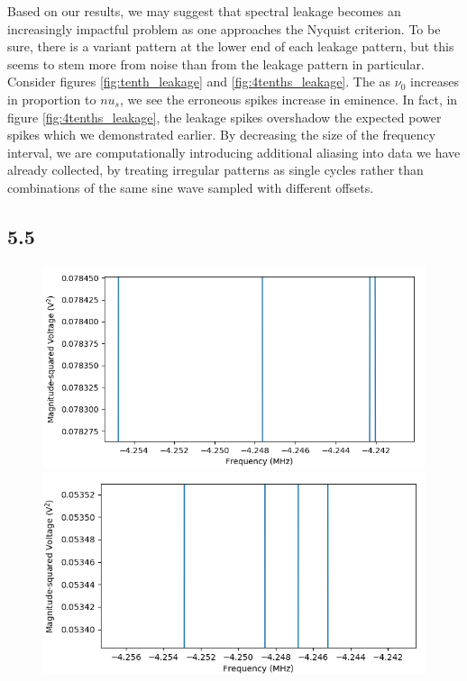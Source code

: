 \documentclass[a4paper]{article}
\begin{document}
Based on our results, we may suggest that spectral leakage becomes an increasingly impactful problem as one approaches the Nyquist criterion. To be sure, there is a variant pattern at the lower end of each leakage pattern, but this seems to stem more from noise than from the leakage pattern in particular. Consider figures \ref{fig:tenth_leakage} and \ref{fig:4tenths_leakage}. The as $\nu_0$ increases in proportion to $nu_s$, we see the erroneous spikes increase in eminence. In fact, in figure \ref{fig:4tenths_leakage}, the leakage spikes overshadow the expected power spikes which we demonstrated earlier. By decreasing the size of the frequency interval, we are computationally introducing additional aliasing into data we have already collected, by treating irregular patterns as single cycles rather than combinations of the same sine wave sampled with different offsets.

\subsection{5.5}

\begin{figure}
\centering
\begin{minipage}{.5\textwidth}
	\centering
	\includegraphics[width=.9\linewidth]{5-5/10k_factor8}
	\caption{}
	\label{fig:10kf8}
\end{minipage}%
\begin{minipage}{.5\textwidth}
	\centering
	\includegraphics[width=.9\linewidth]{5-5/5k_factor16}
	\caption{}
	\label{fig:5kf16}
\end{minipage}
\end{figure}
\end{document}
